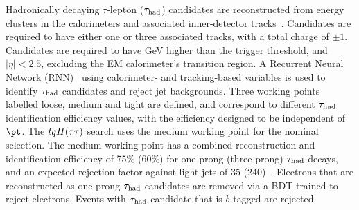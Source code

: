 Hadronically decaying $\tau$-lepton ($\tau_{\mathrm{had}}$) candidates are reconstructed from energy clusters in the calorimeters and
associated inner-detector tracks~\cite{ATL-PHYS-PUB-2019-033}. %
Candidates are required to have either one or three associated tracks,
with a total charge of $\pm 1$. Candidates are required to have  GeV higher than the trigger threshold, and $|\eta|<2.5$,
excluding the EM calorimeter's transition region.
A Recurrent Neural Network (RNN)~\cite{Graves:2012SCI}
using calorimeter- and tracking-based variables is used to identify $\tau_{\mathrm{had}}$ candidates and reject jet backgrounds.
Three working points labelled loose, medium and tight are defined, and correspond to different $\tau_{\mathrm{had}}$ identification efficiency values, with the efficiency designed to be independent of $\pt$. The $tqH(\tau\tau)$ search uses the medium
working point for the nominal selection.
The medium working point has a combined reconstruction and identification efficiency of 75\% (60\%) for one-prong (three-prong) $\tau_{\mathrm{had}}$ 
decays, and an expected rejection factor against light-jets of 35 (240)~\cite{ATL-PHYS-PUB-2019-033}. 
Electrons that are reconstructed as one-prong $\tau_{\mathrm{had}}$ candidates are removed via a BDT trained to reject electrons.
Events with $\tau_{\mathrm{had}}$ candidate that is $b$-tagged are rejected.

